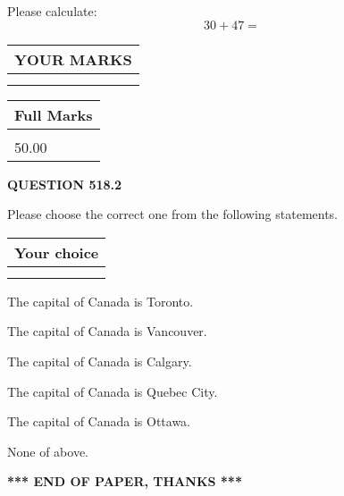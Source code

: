 \documentclass[12pt]{article}
\begin{document}
  
 
Please calculate:
\begin{equation}
30 +  %
47 = \nonumber
\end{equation}
 

 

 
  
\vspace{0.2in}
  
\noindent\begin{tabular}{|l|}
\hline
 YOUR MARKS  \\
\hline
 \\ 
 \\ 
\hline
\end{tabular}
\hspace{0.05in} \begin{tabular}{|l|}
\hline
 Full Marks  \\
\hline
 \\ 
50.00 \\
\hline
\end{tabular}
{\textbf{\Large{QUESTION
518.2 
}}}
  
  
Please choose the correct one from the following statements.
  
  
\noindent\hspace{3.0in} \begin{tabular}{|l|}
\hline
Your choice \\
\hline
 \\ 
 \\ 
\hline
\end{tabular}
  
  
 
 
The capital of Canada is Toronto.
 
 
The capital of Canada is Vancouver.
 
 
The capital of Canada is Calgary.
 
 
The capital of Canada is Quebec City.
 
 
The capital of Canada is Ottawa.
 
 
 None of above.
 
 
   
   
 \vspace{0.2in}
 
   
   
   
   
\vspace{1.0in} 
{\textbf{\large{ *** END OF PAPER, THANKS *** }}} 
   
\end{document}
